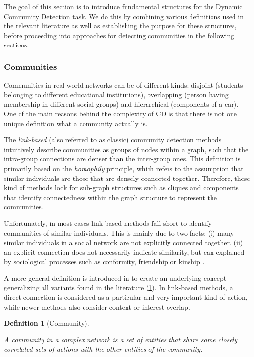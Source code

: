 \documentclass[
acmsmall,
nonacm,
screen,
acmthm]{acmart}
\newtheorem{dfn}{Definition}
\begin{document}
The goal of this section is to introduce fundamental structures for the
Dynamic Community Detection task. We do this by combining various
definitions used in the relevant literature as well as establishing the
purpose for these structures, before proceeding into approaches for
detecting communities in the following sections.

\hypertarget{communities}{%
\subsubsection{Communities}\label{communities}}

Communities in real-world networks can be of different kinds: disjoint
(students belonging to different educational institutions), overlapping
(person having membership in different social groups) and hierarchical
(components of a car). One of the main reasons behind the complexity of
CD is that there is not one unique definition what a community actually
is.

The \emph{link-based} (also referred to as classic) community detection
methods intuitively describe communities as groups of nodes within a
graph, such that the intra-group connections are denser than the
inter-group ones. This definition is primarily based on the
\emph{homophily} principle, which refers to the assumption that similar
individuals are those that are densely connected together. Therefore,
these kind of methods look for sub-graph structures such as cliques and
components that identify connectedness within the graph structure to
represent the communities.

Unfortunately, in most cases link-based methods fall short to identify
communities of similar individuals. This is mainly due to two facts: (i)
many similar individuals in a social network are not explicitly
connected together, (ii) an explicit connection does not necessarily
indicate similarity, but can explained by sociological processes such as
conformity, friendship or kinship
\citep{diehlRelationshipIdentificationSocial2007, faniUserCommunityDetection2020}.

A more general definition is introduced in
\citep{cosciaClassificationCommunityDiscovery2011} to create an
underlying concept generalizing all variants found in the literature
(\cref{dfn:community}). In link-based methods, a direct connection is
considered as a particular and very important kind of action, while
newer methods also consider content or interest overlap.

\begin{dfn}[Community]\label{dfn:community} 

A community in a complex network is a set of entities that share some
closely correlated sets of actions with the other entities of the
community.

\end{dfn}
\end{document}
